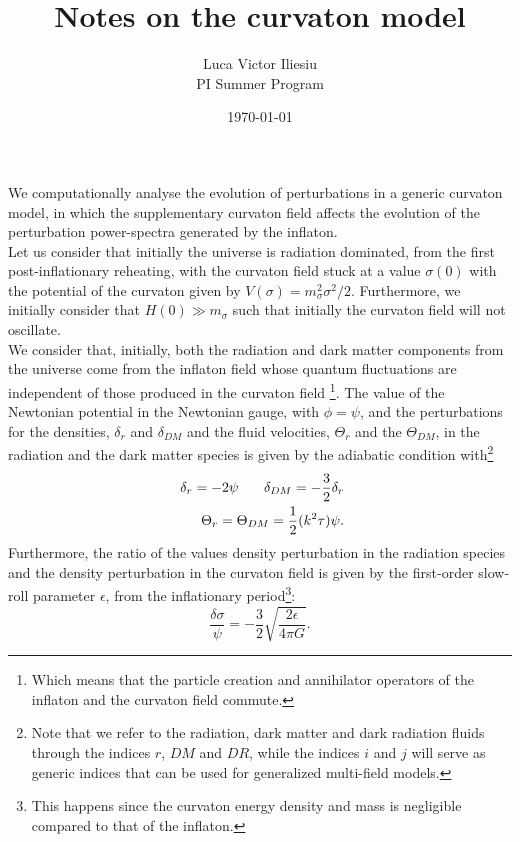 \documentclass[11pt]{article}
\begin{document}
\author{Luca Victor Iliesiu\\ PI Summer Program}
\date{\today}
\title{Notes on the curvaton model}

\maketitle


We computationally analyse the evolution of perturbations in a generic curvaton model, in which the supplementary curvaton field affects the evolution of the perturbation power-spectra generated by the inflaton. \\
\indent Let us consider that initially the universe is radiation dominated, from the first post-inflationary reheating, with the curvaton field stuck at a value $\sigma(0)$ with the potential of the curvaton given by $V(\sigma) = m_{\sigma}^2 \sigma^2/2$. Furthermore, we initially consider that $H(0) \gg m_{\sigma}$ such that initially the curvaton field will not oscillate. \\
\indent We consider that, initially, both the radiation and dark matter components from the universe come from the inflaton field whose quantum fluctuations are independent of those produced in the curvaton field \footnote{Which means that the particle creation and annihilator operators of the inflaton and the curvaton field commute. }. The value of the Newtonian potential in the Newtonian gauge, with $\phi = \psi$, and the perturbations for the densities, $\delta_r$ and $\delta_{DM}$ and the fluid velocities, $\Theta_r$ and the $\Theta_{DM}$, in the radiation and the dark matter species is given by the adiabatic condition with\footnote{Note that we refer to the radiation, dark matter and dark radiation fluids through the indices $r$, $DM$ and $DR$, while the indices $i$ and $j$ will serve as generic indices that can be used for generalized multi-field models.  }
\begin{eqnarray}
\delta_r = -2 \psi \mbox{ \indent} \delta_{DM} = -\frac{3}2 \delta_{r} \nonumber
\\ \mbox{ \indent} \Theta_r = \Theta_{DM} = \frac{1}2 (k^2 \tau) \psi.
\end{eqnarray}
Furthermore, the ratio of the values density perturbation in the radiation species and the density perturbation in the curvaton field is given by the first-order slow-roll parameter $\epsilon$, from the inflationary period\footnote{This happens since the curvaton energy density and mass is negligible compared to that of the inflaton.}:
\begin{equation} 
\frac{\delta \sigma}{\psi} = -\frac{3}2 \sqrt{\frac{2\epsilon}{4 \pi G}}.
\end{equation}
\end{document}
